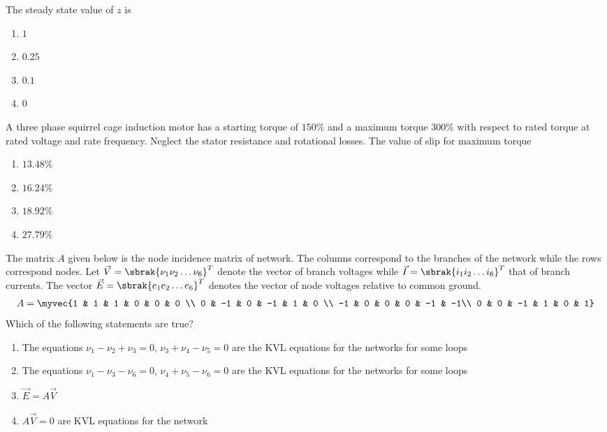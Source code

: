     The steady state value of $z$ is
    \hfill{}
    \begin{multicols}{4}
        \begin{enumerate}
            \item $1$
            \item $0.25$
            \item $0.1$
            \item $0$
        \end{enumerate}
    \end{multicols}

    \item 
    A three phase squirrel cage induction motor has a starting torque of $150\%$ and a maximum torque $300\%$ with respect to rated torque at rated voltage and rate frequency. Neglect the stator resistance and rotational losses. The value of slip for maximum torque
    \hfill{}
    \begin{multicols}{4}
        \begin{enumerate}
            \item $13.48\%$
            \item $16.24\%$
            \item $18.92\%$
            \item $27.79\%$
        \end{enumerate}
    \end{multicols}

    \item 
    The matrix $A$ given below is the node incidence matrix of  network. The columns correspond to the branches of the network while the rows correspond nodes. Let $\vec{V} = \sbrak{\nu_1 \nu_2 \dots \nu_6}^T$ denote the vector of branch voltages while $\vec{I} = \sbrak{i_1 i_2 \dots i_6}^T$ that of branch currents. The vector $\vec{E} = \sbrak{e_1 e_2 \dots e_6}^T$ denotes the vector of node voltages relative to common ground. 
    \begin{align*}
        A = \myvec{1 & 1 & 1 & 0 & 0 & 0 \\ 0 & -1 & 0 & -1 & 1 & 0 \\ -1 & 0 & 0 & 0 & -1 & -1\\ 0 & 0 & -1 & 1 & 0 & 1}
    \end{align*}
    Which of the following statements are true?
    \hfill{}
    \begin{enumerate}
        \item The equations $\nu_1 - \nu_2 + \nu_3 = 0$, $\nu_3 + \nu_4 - \nu_5 = 0$ are the KVL equations for the networks for some loops 
        \item The equations $\nu_1 - \nu_3 - \nu_6 = 0$, $\nu_4 + \nu_5 - \nu_6 = 0$ are the KVL equations for the networks for some loops
        \item $\vec{E} = A\vec{V}$
        \item $A\vec{V} = 0$ are KVL equations for the network
    \end{enumerate}

